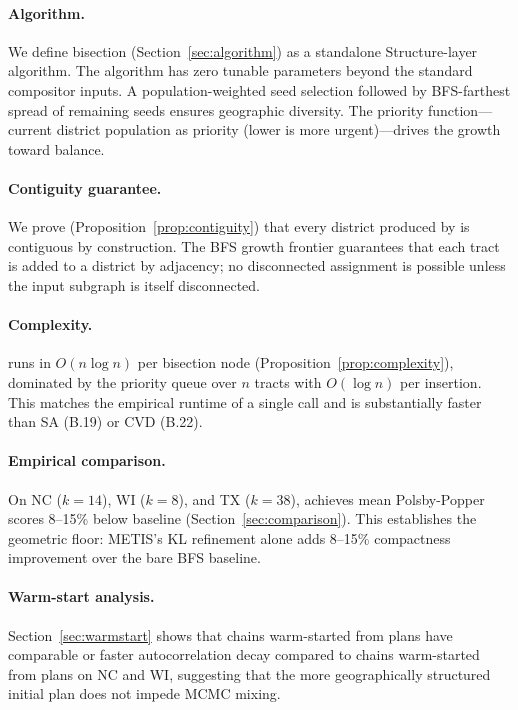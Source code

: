 \paragraph{Algorithm.}
We define \bfsg{} bisection (Section~\ref{sec:algorithm}) as a
standalone Structure-layer algorithm.
The algorithm has zero tunable parameters beyond the standard compositor
inputs.
A population-weighted seed selection followed by BFS-farthest spread
of remaining seeds ensures geographic diversity.
The priority function---current district population as priority (lower
is more urgent)---drives the growth toward balance.

\paragraph{Contiguity guarantee.}
We prove (Proposition~\ref{prop:contiguity}) that every district produced
by \bfsg{} is contiguous by construction.
The BFS growth frontier guarantees that each tract is added to a district
by adjacency; no disconnected assignment is possible unless the input
subgraph is itself disconnected.

\paragraph{Complexity.}
\bfsg{} runs in $O(n \log n)$ per bisection node (Proposition~\ref{prop:complexity}),
dominated by the priority queue over $n$ tracts with $O(\log n)$
per insertion.
This matches the empirical runtime of a single \metis{} call and is
substantially faster than SA (B.19) or CVD (B.22).

\paragraph{Empirical comparison.}
On NC ($k=14$), WI ($k=8$), and TX ($k=38$), \bfsg{} achieves
mean Polsby-Popper scores 8--15\% below baseline \metis{}
(Section~\ref{sec:comparison}).
This establishes the geometric floor: METIS's KL refinement alone adds
8--15\% compactness improvement over the bare BFS baseline.

\paragraph{Warm-start analysis.}
Section~\ref{sec:warmstart} shows that \recom{} chains warm-started from
\bfsg{} plans have comparable or faster autocorrelation decay compared
to chains warm-started from \metis{} plans on NC and WI,
suggesting that the more geographically structured initial plan does not
impede MCMC mixing.


